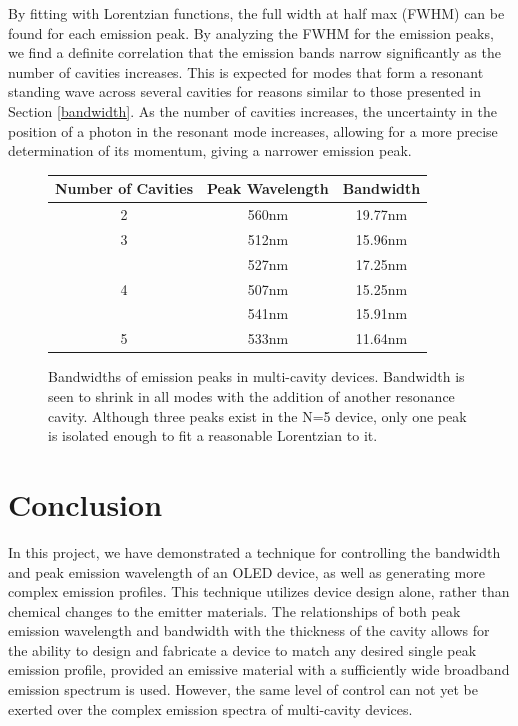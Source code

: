 \documentclass{report}
\begin{document}
        By fitting with Lorentzian functions, the full width at half max (FWHM) can be found for each emission peak. By analyzing the FWHM for the emission peaks, we find a definite correlation that the emission bands narrow significantly as the number of cavities increases. This is expected for modes that form a resonant standing wave across several cavities for reasons similar to those presented in Section \ref{bandwidth}. As the number of cavities increases, the uncertainty in the position of a photon in the resonant mode increases, allowing for a more precise determination of its momentum, giving a narrower emission peak.
        \begin{figure}
            \centering
            \renewcommand{\arraystretch}{1.5}
            \setlength{\tabcolsep}{15pt}
            \begin{tabular}{|c|c|c|}
                \hline
                Number of Cavities & Peak Wavelength & Bandwidth \\
                \hline
                2 & 560nm & 19.77nm \\
                \hline
                3 & 512nm & 15.96nm \\
                  & 527nm & 17.25nm \\
                \hline
                4 & 507nm & 15.25nm \\
                  & 541nm & 15.91nm \\
                \hline
                5 & 533nm & 11.64nm \\
                \hline
            \end{tabular}

            \caption{Bandwidths of emission peaks in multi-cavity devices. Bandwidth is seen to shrink in all modes with the addition of another resonance cavity. Although three peaks exist in the N=5 device, only one peak is isolated enough to fit a reasonable Lorentzian to it.}
            \label{fwhm}
        \end{figure}


\chapter{Conclusion} \label{concl}

    In this project, we have demonstrated a technique for controlling the bandwidth and peak emission wavelength of an OLED device, as well as generating more complex emission profiles. This technique utilizes device design alone, rather than chemical changes to the emitter materials. The relationships of both peak emission wavelength and bandwidth with the thickness of the cavity allows for the ability to design and fabricate a device to match any desired single peak emission profile, provided  an emissive material with a sufficiently wide broadband emission spectrum is used. However, the same level of control can not yet be exerted over the complex emission spectra of multi-cavity devices.
    
\end{document}

